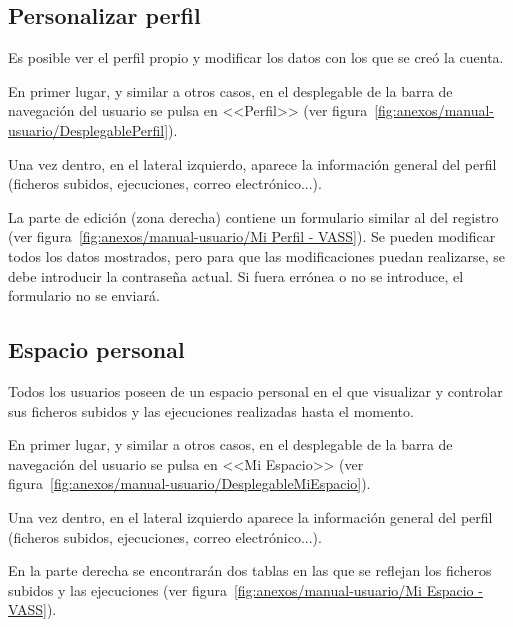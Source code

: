 \subsection{Personalizar perfil}

Es posible ver el perfil propio y modificar los datos con los que se creó la
cuenta.

En primer lugar, y similar a otros casos, en el desplegable de la barra de
navegación del usuario se pulsa en <<Perfil>> (ver
figura~\ref{fig:anexos/manual-usuario/DesplegablePerfil}).


Una vez dentro, en el lateral izquierdo, aparece la información general del
perfil (ficheros subidos, ejecuciones, correo electrónico...).

La parte de edición (zona derecha) contiene un formulario similar al del
registro (ver figura~\ref{fig:anexos/manual-usuario/Mi Perfil - VASS}). Se
pueden modificar todos los datos mostrados, pero para que las modificaciones
puedan realizarse, se debe introducir la contraseña actual. Si fuera errónea o
no se introduce, el formulario no se enviará.

\label{mu:perfil}

\subsection{Espacio personal}

Todos los usuarios poseen de un espacio personal en el que visualizar y
controlar sus ficheros subidos y las ejecuciones realizadas hasta el momento.

En primer lugar, y similar a otros casos, en el desplegable de la barra de
navegación del usuario se pulsa en <<Mi Espacio>> (ver
figura~\ref{fig:anexos/manual-usuario/DesplegableMiEspacio}).


Una vez dentro, en el lateral izquierdo aparece la información general del
perfil (ficheros subidos, ejecuciones, correo electrónico...).

En la parte derecha se encontrarán dos tablas en las que se reflejan los
ficheros subidos y las ejecuciones (ver figura~\ref{fig:anexos/manual-usuario/Mi
Espacio - VASS}).

